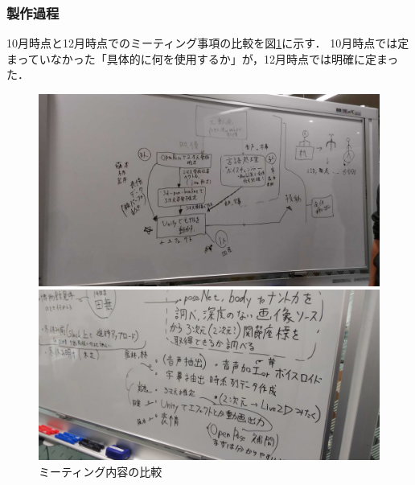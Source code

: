 \subsubsection{製作過程}
10月時点と12月時点でのミーティング事項の比較を図\ref{fig:iw132compare}に示す．
10月時点では定まっていなかった「具体的に何を使用するか」が，12月時点では明確に定まった．

\begin{figure}[h]
  \centering
 \begin{minipage}[b]{0.45\linewidth}
  \centering
  \includegraphics[width=1.0\textwidth]{fig/iw1321.png}
  \end{minipage}
 \begin{minipage}[b]{0.08\linewidth}
  \centering
 \end{minipage}
 \begin{minipage}[b]{0.45\linewidth}
  \centering
  \includegraphics[width=1.0\textwidth]{fig/iw1322.png}
  \end{minipage}
 \caption{ミーティング内容の比較}
 \label{fig:iw132compare}
\end{figure}




